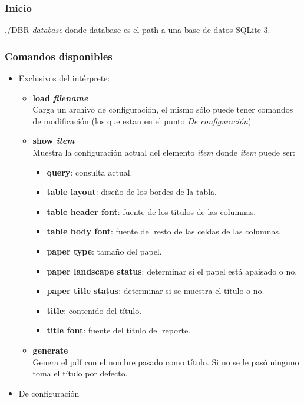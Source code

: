 \documentclass[a4paper,12pt]{article}
\begin{document}
	\subsubsection*{Inicio\\}
	./DBR \textit{database} donde {database} es el path a una base de datos SQLite 3.
	\subsubsection*{Comandos disponibles}
	\begin{itemize}
	\item Exclusivos del intérprete:
		\begin{itemize}
		\item \textbf{load \textit{filename}}\\
		Carga un archivo de configuración, el mismo sólo puede tener comandos de modificación (los que estan en el punto \textit{De configuración})%
		\item \textbf{show \textit{item}}\\
		Muestra la configuración actual del elemento \textit{item} donde \textit{item} puede ser:
			\begin{itemize}
			\item \textbf{query}: consulta actual.
			\item \textbf{table layout}: diseño de los bordes de la tabla.
			\item \textbf{table header font}: fuente de los títulos de las columnas.
			\item \textbf{table body font}: fuente del resto de las celdas de las columnas.
			\item \textbf{paper type}: tamaño del papel.
			\item \textbf{paper landscape status}: determinar si el papel está apaisado o no.
			\item \textbf{paper title status}: determinar si se muestra el título o no.
			\item \textbf{title}: contenido del título.
			\item \textbf{title font}: fuente del título del reporte.
			\end{itemize}
		\item \textbf{generate}\\
		Genera el pdf con el nombre pasado como título. Si no se le pasó ninguno toma el título por defecto. %
		\end{itemize} 
	\item De configuración\\

\end{itemize}
\end{document}
